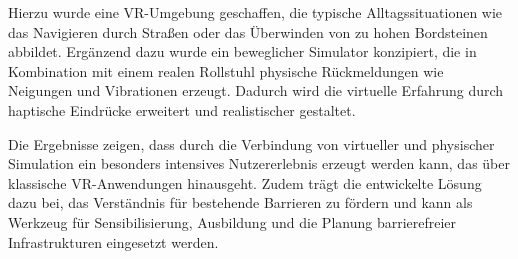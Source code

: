 Hierzu wurde eine VR-Umgebung geschaffen, die typische Alltagssituationen wie das Navigieren durch Straßen oder das Überwinden von zu hohen Bordsteinen abbildet. Ergänzend dazu wurde ein beweglicher Simulator konzipiert, die in Kombination mit einem realen Rollstuhl physische Rückmeldungen wie Neigungen und Vibrationen erzeugt. Dadurch wird die virtuelle Erfahrung durch haptische Eindrücke erweitert und realistischer gestaltet.

Die Ergebnisse zeigen, dass durch die Verbindung von virtueller und physischer Simulation ein besonders intensives Nutzererlebnis erzeugt werden kann, das über klassische VR-Anwendungen hinausgeht. Zudem trägt die entwickelte Lösung dazu bei, das Verständnis für bestehende Barrieren zu fördern und kann als Werkzeug für Sensibilisierung, Ausbildung und die Planung barrierefreier Infrastrukturen eingesetzt werden.
